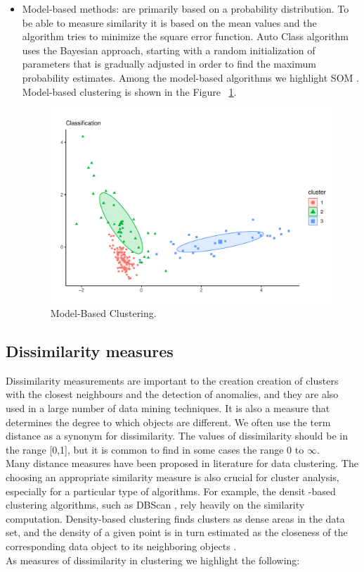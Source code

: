 \begin{itemize}
  \item Model-based methods: are primarily based on a probability distribution. To be able to measure similarity it is based on the mean values and the algorithm tries to minimize the square error function. Auto Class algorithm uses the Bayesian approach, starting with a random initialization of parameters that is gradually adjusted in order to find the maximum probability estimates. Among the model-based algorithms we highlight SOM \citep{b34}. Model-based clustering is shown in the Figure ~\ref{fig:model}.
    \begin{figure}[htbp]
  \centering
   \includegraphics[width=0.9\linewidth, height=0.2\textheight]{img/model.pdf}
    \caption{Model-Based Clustering.}
    \label{fig:model}%
\end{figure}
\end{itemize}

\subsection {Dissimilarity measures}

Dissimilarity measurements are important to the creation creation of clusters with the closest neighbours and the detection of anomalies, and they are also used in a large number of data mining techniques. It is also a measure that determines the degree to which objects are different. We often use the term distance as a synonym for dissimilarity. The values of dissimilarity should be in the range [0,1], but it is common to find in some cases the range 0 to $\infty$.
\\
Many distance measures have been proposed in literature for data clustering. The choosing an appropriate similarity measure is also crucial for cluster analysis, especially for a particular type of algorithms. For example, the densit -based clustering algorithms, such as DBScan \citep{b28}, rely heavily on the similarity computation. Density-based clustering finds clusters as dense areas in the data set, and the density of a given point is in turn estimated as the closeness of the corresponding data object to its neighboring objects \citep{b50} \citep{b51}.
\\
As measures of dissimilarity in clustering we highlight the following:

